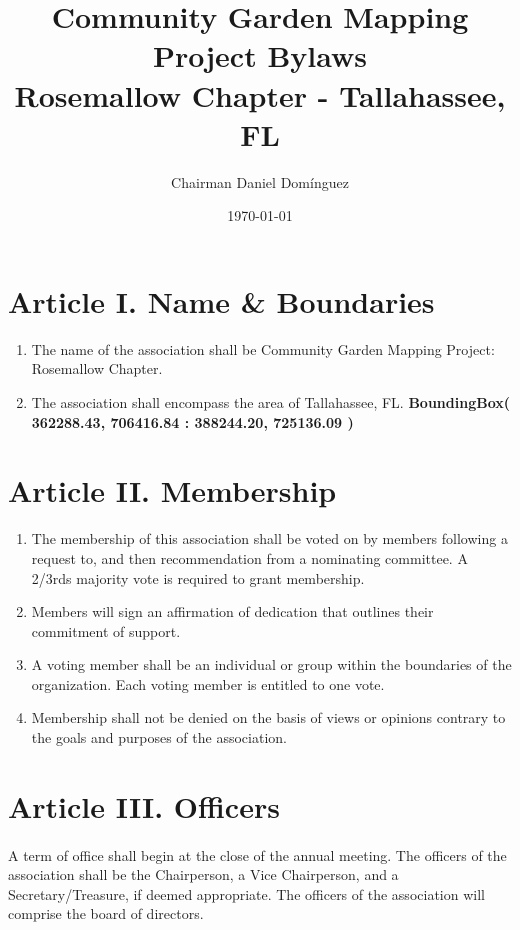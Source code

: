 \documentclass[letterpaper,10pt]{article}
\title{\textbf{{\Large Community Garden Mapping Project Bylaws \\ Rosemallow Chapter - Tallahassee, FL}}}
\author{Chairman Daniel Dom\'inguez}
\date{\today}
\begin{document}
\maketitle

\section*{ Article I. Name \& Boundaries }
\begin{enumerate}[label=(\Alph*)]
\item The name of the association shall be Community Garden Mapping Project: Rosemallow Chapter.
\item The association shall encompass the area of Tallahassee, FL. \textbf{BoundingBox( 362288.43,  706416.84 :
388244.20,  725136.09 )}
\end{enumerate}

\section*{Article II. Membership}
\begin{enumerate}[label=(\Alph*)]
\item The membership of this association shall be voted on by members following a request to, and then recommendation from a nominating committee. A 2/3rds majority vote is required to grant membership. 
\item Members will sign an affirmation of dedication that outlines their commitment of support. 
\item A voting member shall be an individual or group within the boundaries of the organization. Each voting member is entitled to one vote.
\item Membership shall not be denied on the basis of views or opinions contrary to the goals and purposes of the association.
\end{enumerate}

\section*{Article III. Officers}
\paragraph{}A term of office shall begin at the close of the annual meeting. The officers of the association shall be the Chairperson, a Vice Chairperson, and a Secretary/Treasure, if deemed appropriate. The officers of the association will comprise the board of directors.
\end{document}
